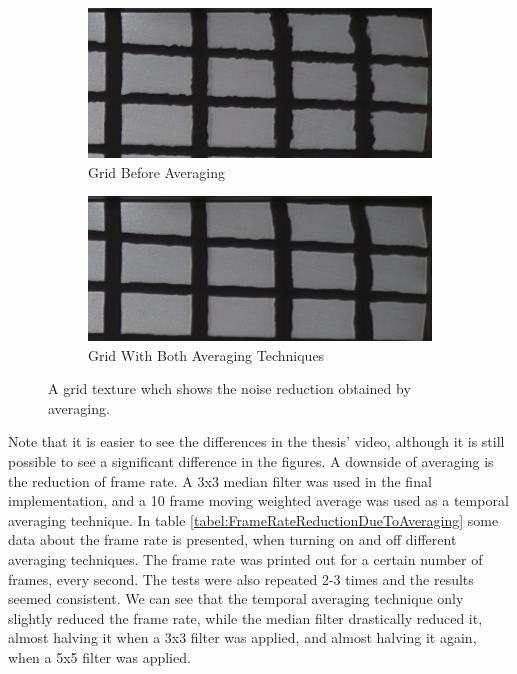 \documentclass[]{article}
\begin{document}
\begin{figure}
\centering
\begin{subfigure}{.5\textwidth}
  \centering
  \includegraphics[width=0.9\linewidth]{figures/NoSmoothingC.png}
  \caption{Grid Before Averaging}
  \label{fig:GridNoAveraging}
\end{subfigure}%
\begin{subfigure}{.5\textwidth}
  \centering
  \includegraphics[width=0.9\linewidth]{figures/BothAveragingTechniquesC.png}
  \caption{Grid With Both Averaging Techniques}
  \label{fig:GridWithAveraging}
\end{subfigure}
\caption{A grid texture whch shows the noise reduction obtained by averaging.}
\label{fig:GridNoiseReduction}
\end{figure}

Note that it is easier to see the differences in the thesis' video, although it is still possible to see a significant difference in the figures. A downside of averaging is the reduction of frame rate. A 3x3 median filter was used in the final implementation, and a 10 frame moving weighted average was used as a temporal averaging technique. In table \ref{tabel:FrameRateReductionDueToAveraging} some data about the frame rate is presented, when turning on and off different averaging techniques. The frame rate was printed out for a certain number of frames, every second. The tests were also repeated 2-3 times and the results seemed consistent. We can see that the temporal averaging technique only slightly reduced the frame rate, while the median filter drastically reduced it, almost halving it when a 3x3 filter was applied, and almost halving it again, when a 5x5 filter was applied.
\end{document}
